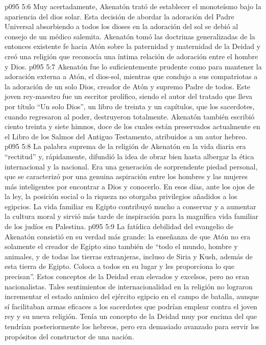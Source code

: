 \vs p095 5:6 Muy acertadamente, Akenatón trató de establecer el monoteísmo bajo la apariencia del dios solar. Esta decisión de abordar la adoración del Padre Universal absorbiendo a todos los dioses en la adoración del sol se debió al consejo de un médico salemita. Akenatón tomó las doctrinas generalizadas de la entonces existente fe hacia Atón sobre la paternidad y maternidad de la Deidad y creó una religión que reconocía una íntima relación de adoración entre el hombre y Dios.
\vs p095 5:7 Akenatón fue lo suficientemente prudente como para mantener la adoración externa a Atón, el dios\hyp{}sol, mientras que condujo a sus compatriotas a la adoración de un solo Dios, creador de Atón y supremo Padre de todos. Este joven rey\hyp{}maestro fue un escritor prolífico, siendo el autor del tratado que lleva por título “Un solo Dios”, un libro de treinta y un capítulos, que los sacerdotes, cuando regresaron al poder, destruyeron totalmente. Akenatón también escribió ciento treinta y siete himnos, doce de los cuales están preservados actualmente en el Libro de los Salmos del Antiguo Testamento, atribuidos a un autor hebreo.
\vs p095 5:8 \pc La palabra suprema de la religión de Akenatón en la vida diaria era “rectitud” y, rápidamente, difundió la idea de obrar bien hasta albergar la ética internacional y la nacional. Era una generación de sorprendente piedad personal, que se caracterizó por una genuina aspiración entre los hombres y las mujeres más inteligentes por encontrar a Dios y conocerlo. En esos días, ante los ojos de la ley, la posición social o la riqueza no otorgaba privilegios añadidos a los egipcios. La vida familiar en Egipto contribuyó mucho a conservar y a aumentar la cultura moral y sirvió más tarde de inspiración para la magnífica vida familiar de los judíos en Palestina.
\vs p095 5:9 La fatídica debilidad del evangelio de Akenatón consistió en su verdad más grande: la enseñanza de que Atón no era solamente el creador de Egipto sino también de “todo el mundo, hombre y animales, y de todas las tierras extranjeras, incluso de Siria y Kush, además de esta tierra de Egipto. Coloca a todos en su lugar y les proporciona lo que precisan”. Estos conceptos de la Deidad eran elevados y excelsos, pero no eran nacionalistas. Tales sentimientos de internacionalidad en la religión no lograron incrementar el estado anímico del ejército egipcio en el campo de batalla, aunque sí facilitaban armas eficaces a los sacerdotes que podrían emplear contra el joven rey y su nueva religión. Tenía un concepto de la Deidad muy por encima del que tendrían posteriormente los hebreos, pero era demasiado avanzado para servir los propósitos del constructor de una nación.
